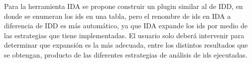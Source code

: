 Para la herramienta IDA se propone construir un plugin similar al de IDD, en donde se enumeran los ids en una tabla, pero el renombre de ids en IDA a diferencia de IDD es más automático, ya que IDA expande los ids por medio de las estrategias que tiene implementadas. El usuario solo deberá intervenir para determinar que expansión es la más adecuada, entre los distintos resultados que se obtengan, producto de las diferentes estrategias de análisis de ids ejecutadas.


